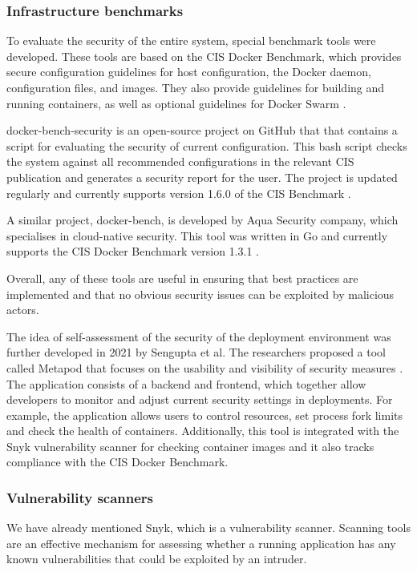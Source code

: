 \subsubsection*{Infrastructure benchmarks}

To evaluate the security of the entire system, special benchmark tools were developed. These tools are based on the CIS Docker Benchmark, which provides secure configuration guidelines for host configuration, the Docker daemon, configuration files, and images. They also provide guidelines for building and running containers, as well as optional guidelines for Docker Swarm \cite{cis:docker}.

docker-bench-security is an open-source project on GitHub that that contains a script for evaluating the security of current configuration. This bash script checks the system against all recommended configurations in the relevant CIS publication and generates a security report for the user. The project is updated regularly and currently supports version 1.6.0 of the CIS Benchmark \cite{gh:docker-bench-security}.

A similar project, docker-bench, is developed by Aqua Security company, which specialises in cloud-native security. This tool was written in Go and currently supports the CIS Docker Benchmark version 1.3.1 \cite{gh:docker-bench}.

Overall, any of these tools are useful in ensuring that best practices are implemented and that no obvious security issues can be exploited by malicious actors.

The idea of self-assessment of the security of the deployment environment was further developed in 2021 by Sengupta et al. The researchers proposed a tool called Metapod that focuses on the usability and visibility of security measures \cite{c:14}. The application consists of a backend and frontend, which together allow developers to monitor and adjust current security settings in deployments. For example, the application allows users to control resources, set process fork limits and check the health of containers. Additionally, this tool is integrated with the Snyk vulnerability scanner for checking container images and it also tracks compliance with the CIS Docker Benchmark.

\subsubsection*{Vulnerability scanners}

We have already mentioned Snyk, which is a vulnerability scanner. Scanning tools are an effective mechanism for assessing whether a running application has any known vulnerabilities that could be exploited by an intruder.

